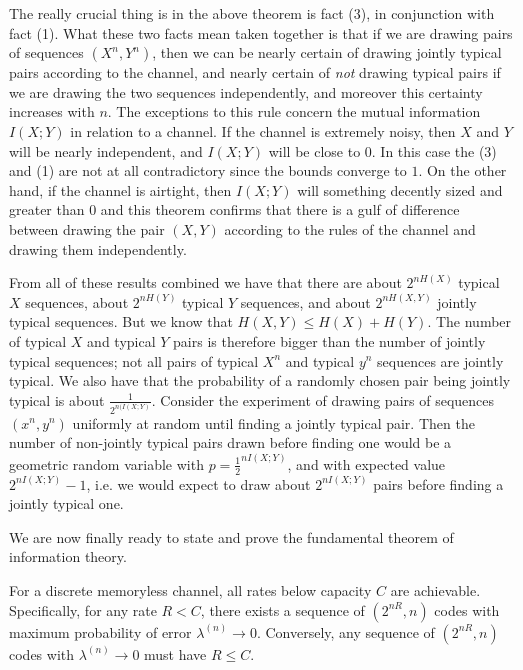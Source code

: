 The really crucial thing is in the above theorem is fact (3), in conjunction with fact (1). What these two facts mean taken together is that if we are drawing pairs of sequences $(X^n,Y^n)$, then we can be nearly certain of drawing jointly typical pairs according to the channel, and nearly certain of \emph{not} drawing typical pairs if we are drawing the two sequences independently, and moreover this certainty increases with $n$. The exceptions to this rule concern the mutual information $I(X;Y)$ in relation to a channel. If the channel is extremely noisy, then $X$ and $Y$ will be nearly independent, and $I(X;Y)$ will be close to $0$. In this case the (3) and (1) are not at all contradictory since the bounds converge to $1$. On the other hand, if the channel is airtight, then $I(X;Y)$ will something decently sized and greater than $0$ and this theorem confirms that there is a gulf of difference between drawing the pair $(X,Y)$ according to the rules of the channel and drawing them independently. \par 
From all of these results combined we have that there are about $2^{nH(X)}$ typical $X$ sequences, about $2^{nH(Y)}$ typical $Y$ sequences, and about $2^{nH(X,Y)}$ jointly typical sequences. But we know that $H(X,Y) \leq H(X) + H(Y)$. The number of typical $X$ and typical $Y$ pairs is therefore bigger than the number of jointly typical sequences; not all pairs of typical $X^n$ and typical $y^n$ sequences are jointly typical. We also have that the probability of a randomly chosen pair being jointly typical is about $\frac{1}{2^{n(I(X;Y)}}$. Consider the experiment of drawing pairs of sequences $(x^n,y^n)$ uniformly at random until finding a jointly typical pair. Then the number of non-jointly typical pairs drawn before finding one would be a geometric random variable with $p = \frac{1}{2}^{nI(X;Y)}$, and with expected value $2^{nI(X;Y)}-1$, i.e. we would expect to draw about $2^{nI(X;Y)}$ pairs before finding a jointly typical one. \par 
We are now finally ready to state and prove the fundamental theorem of information theory.
\begin{theorem}
	For a discrete memoryless channel, all rates below capacity $C$ are achievable. Specifically, for any rate $R < C$, there exists a sequence of $(2^{nR},n)$ codes with maximum probability of error $\lambda^{(n)} \to 0$. Conversely, any sequence of $(2^{nR},n)$ codes with $\lambda^{(n)} \to 0$ must have $R \leq C$.  
\end{theorem}
